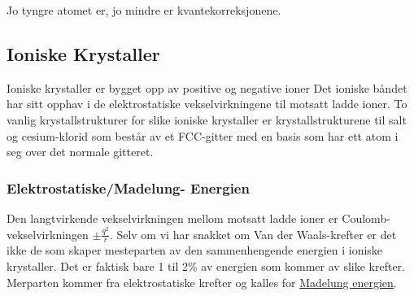 \documentclass{article}
\begin{document}
Jo tyngre atomet er, jo mindre er kvantekorreksjonene.

\subsection{Ioniske Krystaller}
Ioniske krystaller er bygget opp av positive og negative ioner Det ioniske båndet har sitt opphav i de elektrostatiske vekselvirkningene til motsatt ladde ioner. To vanlig krystallstrukturer for slike ioniske krystaller er krystallstrukturene til salt og cesium-klorid som består av et FCC-gitter med en basis som har ett atom i seg over det normale gitteret. 

\subsubsection{Elektrostatiske/Madelung- Energien}
Den langtvirkende vekselvirkningen mellom motsatt ladde ioner er Coulomb-vekselvirkningen $\pm \frac{q^2}{r}$. Selv om vi har snakket om Van der Waals-krefter er det ikke de som skaper mesteparten av den sammenhengende energien i ioniske krystaller. Det er faktisk bare 1 til 2\% av energien som kommer av slike krefter. Merparten kommer fra elektrostatiske krefter og kalles for \underline{Madelung energien}.
\end{document}

